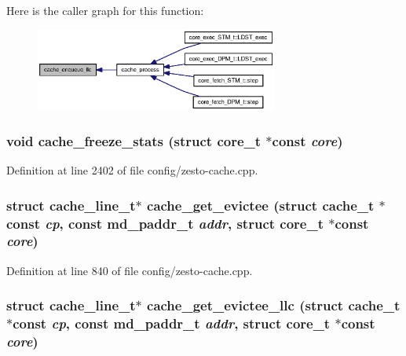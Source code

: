 Here is the caller graph for this function:\nopagebreak
\begin{figure}[H]
\begin{center}
\leavevmode
\includegraphics[width=226pt]{config_2zesto-cache_8h_6955e78ccb0fb1511754e8cd113e1dcc_icgraph}
\end{center}
\end{figure}
\subsubsection[{cache\_\-freeze\_\-stats}]{\setlength{\rightskip}{0pt plus 5cm}void cache\_\-freeze\_\-stats (struct {\bf core\_\-t} $\ast$const  {\em core})}\label{config_2zesto-cache_8h_bd1fe8334f2259dc773b85f98c7fbcfa}




Definition at line 2402 of file config/zesto-cache.cpp.
\subsubsection[{cache\_\-get\_\-evictee}]{\setlength{\rightskip}{0pt plus 5cm}struct {\bf cache\_\-line\_\-t}$\ast$ cache\_\-get\_\-evictee (struct {\bf cache\_\-t} $\ast$const  {\em cp}, \/  const {\bf md\_\-paddr\_\-t} {\em addr}, \/  struct {\bf core\_\-t} $\ast$const  {\em core})\hspace{0.3cm}{\tt  [read]}}\label{config_2zesto-cache_8h_ff8ad962ac5134671915f22e604a2f4e}




Definition at line 840 of file config/zesto-cache.cpp.
\subsubsection[{cache\_\-get\_\-evictee\_\-llc}]{\setlength{\rightskip}{0pt plus 5cm}struct {\bf cache\_\-line\_\-t}$\ast$ cache\_\-get\_\-evictee\_\-llc (struct {\bf cache\_\-t} $\ast$const  {\em cp}, \/  const {\bf md\_\-paddr\_\-t} {\em addr}, \/  struct {\bf core\_\-t} $\ast$const  {\em core})\hspace{0.3cm}{\tt  [read]}}\label{config_2zesto-cache_8h_77864b4219a45ec15cbe3ff986d131b9}




